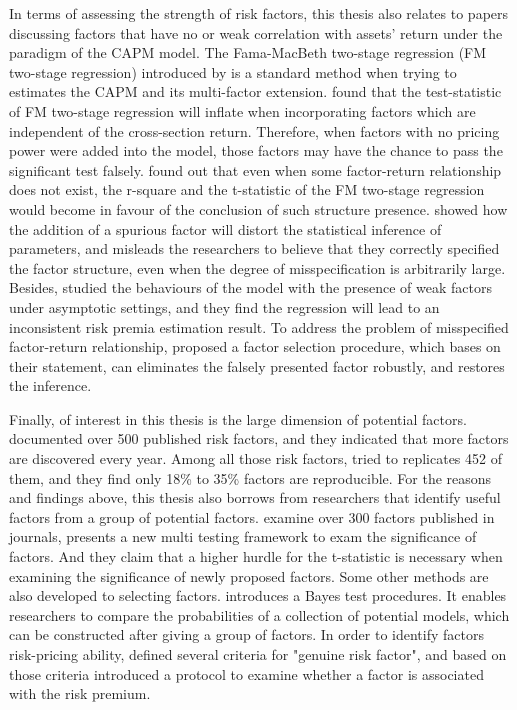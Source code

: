 In terms of assessing the strength of risk factors, this thesis also relates to papers discussing factors that have no or weak correlation with assets' return under the paradigm of the CAPM model.
The Fama-MacBeth two-stage regression (FM two-stage regression) introduced by  is a standard method when trying to estimates the CAPM and its multi-factor extension. 
 found that the test-statistic of FM two-stage regression will inflate when incorporating factors which are independent of the cross-section return.
Therefore, when factors with no pricing power were added into the model, those factors may have the chance to pass the significant test falsely.
 found out that even when some factor-return relationship does not exist, the r-square and the t-statistic of the FM two-stage regression would become in favour of the conclusion of such structure presence. 
 showed how the addition of a spurious factor will distort the statistical inference of parameters, and misleads the researchers to believe that they correctly specified the factor structure, even when the degree of misspecification is arbitrarily large.
Besides,  studied the behaviours of the model with the presence of weak factors under asymptotic settings, and they find the regression will lead to an inconsistent risk premia estimation result.
To address the problem of misspecified factor-return relationship,  proposed a factor selection procedure, which bases on their statement, can eliminates the falsely presented factor robustly, and restores the inference. 
	
Finally, of interest in this thesis is the large dimension of potential factors.
 documented over 500 published risk factors, and they indicated that more factors are discovered every year.
Among all those risk factors,  tried to replicates 452 of them, and they find only 18\% to 35\% factors are reproducible.
For the reasons and findings above, this thesis also borrows from researchers that identify useful factors from a group of potential factors.
 examine over 300 factors published in journals, presents a new multi testing framework to exam the significance of factors.
And they claim that a higher hurdle for the t-statistic is necessary when examining the significance of newly proposed factors.
Some other methods are also developed to selecting factors.
 introduces a Bayes test procedures.
It enables researchers to compare the probabilities of a collection of potential models, which can be constructed after giving a group of factors.
In order to identify factors risk-pricing ability,  defined several criteria for "genuine risk factor", and based on those criteria introduced a protocol to examine whether a factor is associated with the risk premium.

